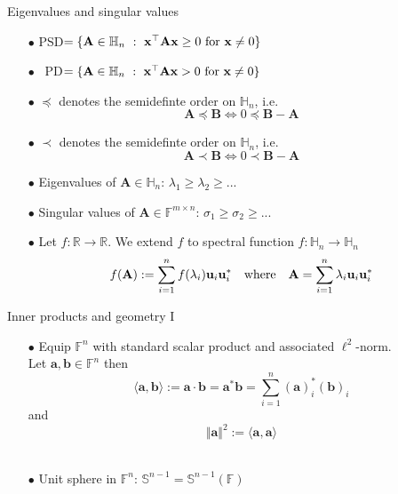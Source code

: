 \documentclass{beamer}
\newcommand{\bvec}[1]{\mathbf{#1}}
\newcommand{\va}{\bvec{a}}
\newcommand{\vb}{\bvec{b}}
\newcommand{\vu}{\bvec{u}}
\newcommand{\vx}{\bvec{x}}
\newcommand{\vA}{\bvec{A}}
\newcommand{\vB}{\bvec{B}}
\begin{document}
\begin{frame}{Eigenvalues and singular values}

\begin{itemize}
    \item[$\bullet$] PSD$=\{\vA \in \mathbb{H}_n ~:~ \vx^\top \vA \vx \geq 0 ~{\rm for}~ \vx \neq 0\}$
     \item[$\bullet$] \;~PD$=\{\vA \in \mathbb{H}_n ~:~ \vx^\top \vA \vx > 0 ~{\rm for}~ \vx \neq 0 \}$
     \item[$\bullet$] $\preccurlyeq$ denotes the semidefinte order on $\mathbb{H}_n$, i.e. 
     $$
     \vA \preccurlyeq \vB \Leftrightarrow 0 \preccurlyeq \vB- \vA
     $$
     \item[$\bullet$] $\prec$ denotes the semidefinte order on $\mathbb{H}_n$, i.e. 
     $$
     \vA \prec \vB \Leftrightarrow 0  \prec \vB- \vA
     $$
     \item[$\bullet$] Eigenvalues of $\vA\in \mathbb{H}_n$: $\lambda_1 \geq \lambda_2\geq ...$
     \item[$\bullet$] Singular values of $\vA\in\mathbb{F}^{m\times n}$: $\sigma_1 \geq \sigma_2\geq ...$
     \item[$\bullet$] Let $f:\mathbb{R} \to \mathbb{R}$. We extend $f$ to spectral function $f:\mathbb{H}_n \to \mathbb{H}_n$
     $$
     f(\vA)
     :=
     \sum_{i=1}^n f(\lambda_i) \vu_i \vu_i^*
    \quad {\rm where} \quad
    \vA = \sum_{i=1}^n \lambda_i \vu_i \vu_i^*
     $$
\end{itemize}
\end{frame}

\begin{frame}{Inner products and geometry I}

\begin{itemize}
    \item[$\bullet$] Equip $\mathbb{F}^n$ with standard scalar product and associated $\ell^2$-norm.\\
    Let $\va, \vb \in \mathbb{F}^n$ then
    $$\langle \va, \vb  \rangle := \va \cdot \vb = \va^* \vb = \sum_{i=1}^n (\va)_i^* (\vb)_i$$
    and
    $$\Vert \va \Vert^2 := \langle \va, \va  \rangle$$\
    \item[$\bullet$] Unit sphere in $\mathbb{F}^n$: $\mathbb{S}^{n-1} = \mathbb{S}^{n-1}(\mathbb{F})$
\end{itemize}
    
\end{frame}
\end{document}
